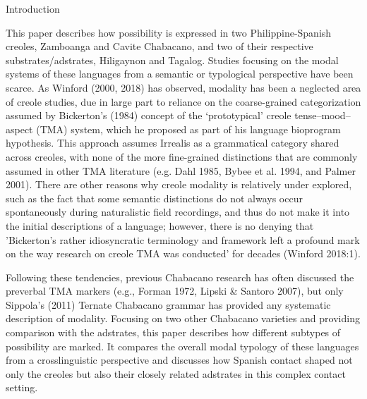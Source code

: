 \setcounter{listWWNumiiileveli}{0}
\begin{listWWNumiiileveli}
\item 
\begin{stylelsSectioni}
Introduction
\end{stylelsSectioni}
\end{listWWNumiiileveli}
\begin{styleStandard}
This paper describes how possibility is expressed in two Philippine-Spanish creoles, Zamboanga and Cavite Chabacano, and two of their respective substrates/adstrates, Hiligaynon and Tagalog. Studies focusing on the modal systems of these languages from a semantic or typological perspective have been scarce. As Winford (2000, 2018) has observed, modality has been a neglected area of creole studies, due in large part to reliance on the coarse-grained categorization assumed by Bickerton's (1984) concept of the ‘prototypical’ creole tense–mood–aspect (TMA) system, which he proposed as part of his language bioprogram hypothesis. This approach assumes Irrealis as a grammatical category shared across creoles, with none of the more fine-grained distinctions that are commonly assumed in other TMA literature (e.g. Dahl 1985, Bybee et al. 1994, and Palmer 2001). There are other reasons why creole modality is relatively under explored, such as the fact that some semantic distinctions do not always occur spontaneously during naturalistic field recordings, and thus do not make it into the initial descriptions of a language; however, there is no denying that 'Bickerton’s rather idiosyncratic terminology and framework left a profound mark on the way research on creole TMA was conducted' for decades (Winford 2018:1). 
\end{styleStandard}

\begin{styleStandard}
Following these tendencies, previous Chabacano research has often discussed the preverbal TMA markers (e.g., Forman 1972, Lipski \& Santoro 2007), but only Sippola's (2011) Ternate Chabacano grammar has provided any systematic description of modality. Focusing on two other Chabacano varieties and providing comparison with the adstrates, this paper describes how different subtypes of possibility are marked. It compares the overall modal typology of these languages from a crosslinguistic perspective and discusses how Spanish contact shaped not only the creoles but also their closely related adstrates in this complex contact setting. 
\end{styleStandard}

